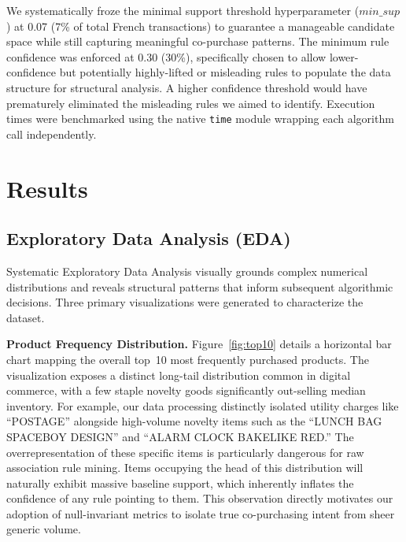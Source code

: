 \documentclass[conference]{IEEEtran}
\begin{document}
We systematically froze the minimal support threshold hyperparameter ($min\_sup$) at 0.07 (7\% of total French transactions) to guarantee a manageable candidate space while still capturing meaningful co-purchase patterns. The minimum rule confidence was enforced at 0.30 (30\%), specifically chosen to allow lower-confidence but potentially highly-lifted or misleading rules to populate the data structure for structural analysis. A higher confidence threshold would have prematurely eliminated the misleading rules we aimed to identify. Execution times were benchmarked using the native \texttt{time} module wrapping each algorithm call independently.

\section{Results}

\subsection{Exploratory Data Analysis (EDA)}
Systematic Exploratory Data Analysis visually grounds complex numerical distributions and reveals structural patterns that inform subsequent algorithmic decisions. Three primary visualizations were generated to characterize the dataset.

\textbf{Product Frequency Distribution.} Figure~\ref{fig:top10} details a horizontal bar chart mapping the overall top~10 most frequently purchased products. The visualization exposes a distinct long-tail distribution common in digital commerce, with a few staple novelty goods significantly out-selling median inventory. For example, our data processing distinctly isolated utility charges like ``POSTAGE'' alongside high-volume novelty items such as the ``LUNCH BAG SPACEBOY DESIGN'' and ``ALARM CLOCK BAKELIKE RED.'' The overrepresentation of these specific items is particularly dangerous for raw association rule mining. Items occupying the head of this distribution will naturally exhibit massive baseline support, which inherently inflates the confidence of any rule pointing to them. This observation directly motivates our adoption of null-invariant metrics to isolate true co-purchasing intent from sheer generic volume.
\end{document}
